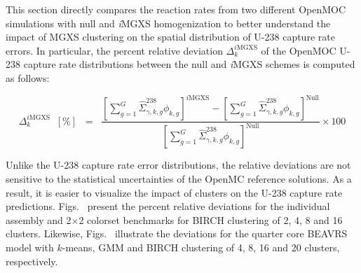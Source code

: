 This section directly compares the reaction rates from two different OpenMOC simulations with null and \textit{i}\ac{MGXS} homogenization to better understand the impact of \ac{MGXS} clustering on the spatial distribution of U-238 capture rate errors. In particular, the percent relative deviation $\Delta_{k}^{\mathrm{\textit{i}MGXS}}$ of the OpenMOC U-238 capture rate distributions between the null and \textit{i}\ac{MGXS} schemes is computed as follows:

\begin{equation}
\label{eqn:chap11-compare-openmoc}
\Delta_{k}^{\mathrm{\textit{i}MGXS}} \;\; [\%] \;\; = \;\; \frac{\left[\displaystyle\sum\limits_{g=1}^{G} \hat{\Sigma}^{238}_{\gamma,k,g}\phi_{k,g}\right]^{\mathrm{\textit{i}MGXS}} - \left[\displaystyle\sum\limits_{g=1}^{G} \hat{\Sigma}^{238}_{\gamma,k,g}\phi_{k,g}\right]^{\mathrm{Null}}}{\left[\displaystyle\sum\limits_{g=1}^{G} \hat{\Sigma}^{238}_{\gamma,k,g}\phi_{k,g}\right]^{\mathrm{Null}}} \times 100
\end{equation}

\noindent Unlike the U-238 capture rate error distributions, the relative deviations are not sensitive to the statistical uncertainties of the OpenMC reference solutions. As a result, it is easier to visualize the impact of clusters on the U-238 capture rate predictions. Figs.~ present the percent relative deviations for the individual assembly and 2$\times$2 colorset benchmarks for BIRCH clustering of 2, 4, 8 and 16 clusters. Likewise, Figs.~ illustrate the deviations for the quarter core \ac{BEAVRS} model with $k$-means, \ac{GMM} and BIRCH clustering of 4, 8, 16 and 20 clusters, respectively.

